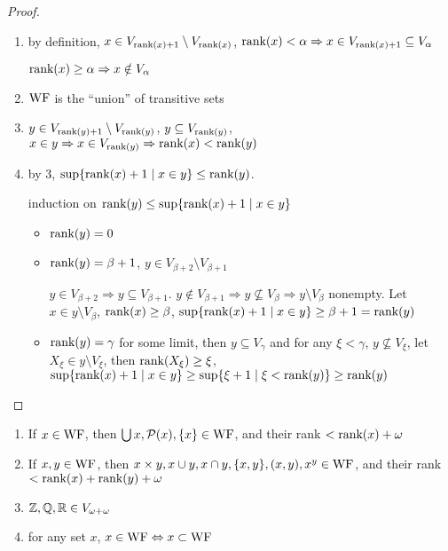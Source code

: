 \documentclass[11pt]{article}
\begin{document}
\begin{proof}
\begin{enumerate}
\item by definition, \(x\in V_{\text{rank}(x)+1}\setminus V_{\text{rank}(x)}\), \(\text{rank}(x)<\alpha\Rightarrow x\in V_{\text{rank}(x)+1}\subseteq V_\alpha\)

\(\text{rank}(x)\ge\alpha\Rightarrow x\notin V_\alpha\)

\item \(\operatorname{WF}\) is the ``union'' of transitive sets

\item \(y\in V_{\text{rank}(y)+1}\setminus V_{\text{rank}(y)}\), \(y\subseteq V_{\text{rank}(y)}\), \(x\in y\Rightarrow x\in V_{\text{rank}(y)}\Rightarrow\text{rank}(x)<\text{rank}(y)\)

\item by 3, \(\sup\{\text{rank}(x)+1\mid x\in y\}\le\text{rank}(y)\).

induction on \(\text{rank}(y)\le\sup\{\text{rank}(x)+1\mid x\in y\}\)
\begin{itemize}
\item \(\text{rank}(y)=0\)
\item \(\text{rank}(y)=\beta+1\), \(y\in V_{\beta+2}\setminus V_{\beta+1}\)

\(y\in V_{\beta+2}\Rightarrow y\subseteq V_{\beta+1}\). \(y\notin V_{\beta+1}\Rightarrow y\not\subseteq V_{\beta}\Rightarrow y\setminus V_\beta\) nonempty.
Let \(x\in y\setminus V_\beta\), \(\text{rank}(x)\ge\beta\), \(\sup\{\text{rank}(x)+1\mid x\in y\}\ge\beta+1=\text{rank}(y)\)
\item \(\text{rank}(y)=\gamma\) for some limit, then \(y\subseteq V_\gamma\) and for any \(\xi<\gamma\), \(y\not\subseteq V_\xi\),
let \(X_\xi\in y\setminus V_\xi\), then \(\text{rank}(X_\xi)\ge\xi\), \(\sup\{\text{rank}(x)+1\mid x\in y\}\ge\sup\{\xi+1\mid\xi<\text{rank}(y)\}\ge\text{rank}(y)\)
\end{itemize}
\end{enumerate}
\end{proof}

\begin{exercise}[7.10.4]
\begin{enumerate}
\item If \(x\in\operatorname{WF}\), then \(\bigcup x,\mathcal{P}(x),\{x\}\in\operatorname{WF}\), and their rank \(<\text{rank}(x)+\omega\)
\item If \(x,y\in\operatorname{WF}\), then \(x\times y,x\cup y,x\cap y,\{x,y\},(x,y),x^y\in\operatorname{WF}\), and their
rank \(<\text{rank}(x)+\text{rank}(y)+\omega\)
\item \(\mathbb{Z},\mathbb{Q},\mathbb{R}\in V_{\omega+\omega}\)
\item for any set \(x\), \(x\in\operatorname{WF}\Leftrightarrow x\subset\operatorname{WF}\)
\end{enumerate}
\end{exercise}
\end{document}
